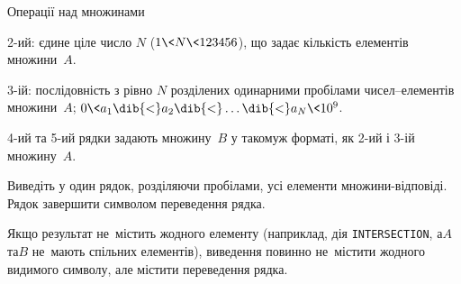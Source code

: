 \begin{problemAllDefault}{Операції над множинами}
\begin{small}
\begin{multicols}{2}
2-ий: єдине ціле число $N$ ($1{\<}N{\<}123456$), що задає кількість елементів множини~$A$.

3-ій: послідовність з рівно $N$ розділених одинарними пробілами чисел--елементів множини~$A$; $0{\<}a_1\dib{{<}}a_2\dib{{<}}\dots\dib{{<}}a_N{\<}10^9$.

4-ий та 5-ий рядки задають множину~$B$ у такому\nolinebreak[3] ж форматі, як \mbox{2-ий} і \mbox{3-ій} множину~$A$.

\OutputFile
Виведіть у один рядок, розділяючи пробілами, усі елементи множини-відповіді. Рядок завершити символом переведення рядка.

Якщо результат не~містить жодного елементу (наприклад, дія \texttt{INTERSECTION}, а\nolinebreak[3] $A$\nolinebreak[2] та\nolinebreak[3] $B$ не~мають спільних елементів), виведення повинно не~містити жодного видимого символу, але містити переведення рядка.

\Examples

\noindent\begin{exampleSimple}{6em}{6em}
%
%
%
\end{exampleSimple}

\end{multicols}

\end{small}

\end{problemAllDefault}